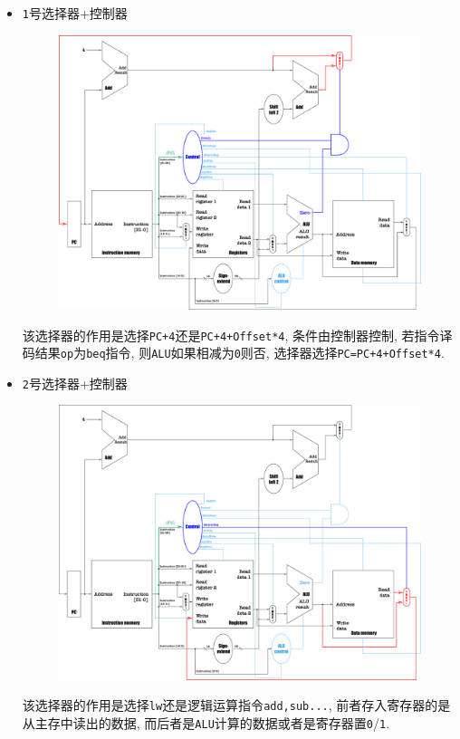 \begin{itemize}
\item \verb|1|号选择器+控制器
\begin{figure}[H]
\centering
\includegraphics[scale=.2]{img/figure32.pdf}
\end{figure}
该选择器的作用是选择\verb|PC+4|还是\verb|PC+4+Offset*4|, 条件由控制器控制, 若指令译码结果\verb|op|为\verb|beq|指令, 则\verb|ALU|如果相减为\verb|0|则否, 选择器选择\verb|PC=PC+4+Offset*4|.
\item \verb|2|号选择器+控制器
\begin{figure}[H]
\centering
\includegraphics[scale=.2]{img/figure33.pdf}
\end{figure}
该选择器的作用是选择\verb|lw|还是逻辑运算指令\verb|add,sub...|, 前者存入寄存器的是从主存中读出的数据, 而后者是\verb|ALU|计算的数据或者是寄存器置\verb|0|/\verb|1|.

\end{itemize}
